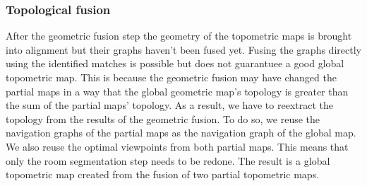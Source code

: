 \subsubsection{Topological fusion}
After the geometric fusion step the geometry of the topometric maps is brought into alignment but their graphs haven't been fused yet. Fusing the graphs directly using the identified matches is possible but does not guarantuee a good global topometric map. This is because the geometric fusion may have changed the partial maps in a way that the global geometric map's topology is greater than the sum of the partial maps' topology. As a result, we have to reextract the topology from the results of the geometric fusion. To do so, we reuse the navigation graphs of the partial maps as the navigation graph of the global map. We also reuse the optimal viewpoints from both partial maps. This means that only the room segmentation step needs to be redone. The result is a global topometric map created from the fusion of two partial topometric maps.

